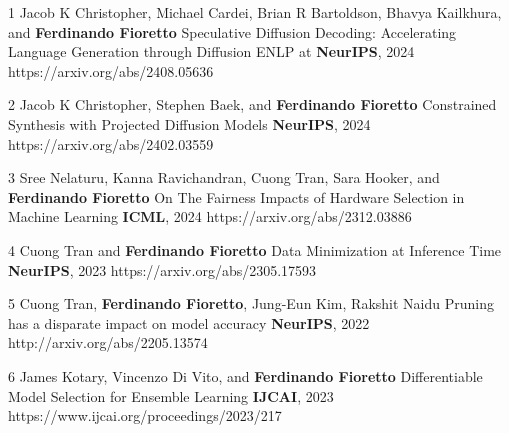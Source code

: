 \documentclass[localFont,alternative]{metadataShortBio}
\begin{document}
{
\begin{pubs}
	
	\confentryShort
	{1}
	{Jacob K Christopher, Michael Cardei, Brian R Bartoldson, Bhavya Kailkhura, and {\bf Ferdinando Fioretto}}
	{Speculative Diffusion Decoding: Accelerating Language Generation through Diffusion}
	{ENLP at {\textbf{NeurIPS}, 2024}}
	{https://arxiv.org/abs/2408.05636}

	\confentryShort
	{2}
	{Jacob K Christopher, Stephen Baek, and {\bf Ferdinando Fioretto}}
	{Constrained Synthesis with Projected Diffusion Models}
	{\textbf{NeurIPS}, 2024}
	{https://arxiv.org/abs/2402.03559}

	\confentryShort
  {3} %
	{Sree Nelaturu, Kanna Ravichandran, Cuong Tran, Sara Hooker, and {\bf Ferdinando Fioretto}}
	{On The Fairness Impacts of Hardware Selection in Machine Learning}
  {\textbf{ICML}, 2024}
	{https://arxiv.org/abs/2312.03886}

	\confentryShort
	{4}
	{{Cuong Tran} and {\bf Ferdinando Fioretto}}
	{Data Minimization at Inference Time}
	{\textbf{NeurIPS}, 2023}
	{https://arxiv.org/abs/2305.17593}

	\confentryShort
	{5}
	{{Cuong Tran}, {\bf Ferdinando Fioretto}, Jung-Eun Kim, {Rakshit Naidu}}
	{Pruning has a disparate impact on model accuracy}
	{\textbf{NeurIPS}, 2022}
	{http://arxiv.org/abs/2205.13574}

	\confentryShort
	{6}
	{James Kotary, Vincenzo Di Vito, and {\bf Ferdinando Fioretto}}
	{Differentiable Model Selection for Ensemble Learning}
	{\textbf{IJCAI}, 2023}
	{https://www.ijcai.org/proceedings/2023/217}




\end{pubs}
}

\vspace{-2pt}
\vspace{-6pt}
\end{document}

